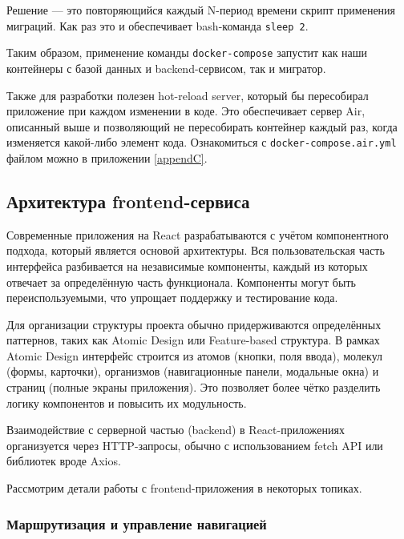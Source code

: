 \documentclass[diploma]{SCWorks}
\begin{document}
Решение — это повторяющийся каждый N-период времени скрипт применения миграций.
Как раз это и обеспечивает bash-команда \texttt{sleep 2}.

Таким образом, применение команды \texttt{docker-compose} запустит как 
наши контейнеры с базой данных и backend-сервисом, так и мигратор.

Также для разработки полезен hot-reload server, который бы пересобирал 
приложение при каждом изменении в коде. Это обеспечивает сервер Air, описанный
выше и позволяющий не пересобирать контейнер каждый раз, когда изменяется 
какой-либо элемент кода. Ознакомиться с \texttt{docker-compose.air.yml} файлом 
можно в приложении \ref{appendC}.

\subsection{Архитектура frontend-сервиса}

Современные приложения на React разрабатываются с учётом компонентного подхода, 
который является основой архитектуры. Вся пользовательская часть интерфейса 
разбивается на независимые компоненты, каждый из которых отвечает за 
определённую часть функционала. Компоненты могут быть переиспользуемыми, 
что упрощает поддержку и тестирование кода. 


Для организации структуры проекта обычно придерживаются определённых паттернов, 
таких как Atomic Design или Feature-based структура. В рамках Atomic Design 
интерфейс строится из атомов (кнопки, поля ввода), молекул (формы, карточки), 
организмов (навигационные панели, модальные окна) и страниц 
(полные экраны приложения). Это позволяет более чётко разделить логику 
компонентов и повысить их модульность.

Взаимодействие с серверной частью (backend) в React-приложениях организуется 
через HTTP-запросы, обычно с использованием fetch API или библиотек вроде 
Axios.

Рассмотрим детали работы с frontend-приложения в некоторых топиках.

\subsubsection{Маршрутизация и управление навигацией}
\end{document}
